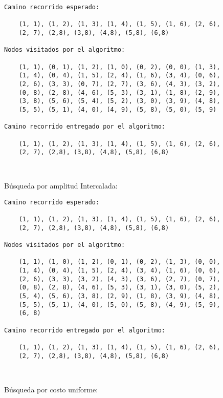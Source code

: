 \begin{lstlisting}[]
Camino recorrido esperado:

    (1, 1), (1, 2), (1, 3), (1, 4), (1, 5), (1, 6), (2, 6), 
    (2, 7), (2,8), (3,8), (4,8), (5,8), (6,8)

Nodos visitados por el algoritmo:

    (1, 1), (0, 1), (1, 2), (1, 0), (0, 2), (0, 0), (1, 3), 
    (1, 4), (0, 4), (1, 5), (2, 4), (1, 6), (3, 4), (0, 6),
    (2, 6), (3, 3), (0, 7), (2, 7), (3, 6), (4, 3), (3, 2),
    (0, 8), (2, 8), (4, 6), (5, 3), (3, 1), (1, 8), (2, 9),
    (3, 8), (5, 6), (5, 4), (5, 2), (3, 0), (3, 9), (4, 8),
    (5, 5), (5, 1), (4, 0), (4, 9), (5, 8), (5, 0), (5, 9)
 
Camino recorrido entregado por el algoritmo:
    
    (1, 1), (1, 2), (1, 3), (1, 4), (1, 5), (1, 6), (2, 6), 
    (2, 7), (2,8), (3,8), (4,8), (5,8), (6,8)

    
\end{lstlisting}
\clearpage
Búsqueda por amplitud Intercalada:\\
\begin{lstlisting}[]
Camino recorrido esperado:

    (1, 1), (1, 2), (1, 3), (1, 4), (1, 5), (1, 6), (2, 6), 
    (2, 7), (2,8), (3,8), (4,8), (5,8), (6,8)

Nodos visitados por el algoritmo:

    (1, 1), (1, 0), (1, 2), (0, 1), (0, 2), (1, 3), (0, 0), 
    (1, 4), (0, 4), (1, 5), (2, 4), (3, 4), (1, 6), (0, 6),
    (2, 6), (3, 3), (3, 2), (4, 3), (3, 6), (2, 7), (0, 7),
    (0, 8), (2, 8), (4, 6), (5, 3), (3, 1), (3, 0), (5, 2), 
    (5, 4), (5, 6), (3, 8), (2, 9), (1, 8), (3, 9), (4, 8),
    (5, 5), (5, 1), (4, 0), (5, 0), (5, 8), (4, 9), (5, 9), 
    (6, 8)

Camino recorrido entregado por el algoritmo:
    
    (1, 1), (1, 2), (1, 3), (1, 4), (1, 5), (1, 6), (2, 6), 
    (2, 7), (2,8), (3,8), (4,8), (5,8), (6,8)

    
\end{lstlisting}

Búsqueda por costo uniforme:\\

